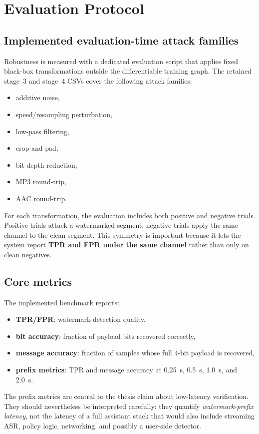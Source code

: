 \section{Evaluation Protocol}
\subsection{Implemented evaluation-time attack families}
Robustness is measured with a dedicated evaluation script that applies fixed black-box transformations outside the differentiable training graph. The retained stage~3 and stage~4 CSVs cover the following attack families:
\begin{itemize}[leftmargin=1.25em]
  \item additive noise,
  \item speed/resampling perturbation,
  \item low-pass filtering,
  \item crop-and-pad,
  \item bit-depth reduction,
  \item MP3 round-trip,
  \item AAC round-trip.
\end{itemize}
For each transformation, the evaluation includes both positive and negative trials. Positive trials attack a watermarked segment; negative trials apply the same channel to the clean segment. This symmetry is important because it lets the system report \textbf{TPR and FPR under the same channel} rather than only on clean negatives.

\subsection{Core metrics}
The implemented benchmark reports:
\begin{itemize}[leftmargin=1.25em]
  \item \textbf{TPR/FPR}: watermark-detection quality,
  \item \textbf{bit accuracy}: fraction of payload bits recovered correctly,
  \item \textbf{message accuracy}: fraction of samples whose full 4-bit payload is recovered,
  \item \textbf{prefix metrics}: TPR and message accuracy at 0.25~s, 0.5~s, 1.0~s, and 2.0~s.
\end{itemize}
The prefix metrics are central to the thesis claim about low-latency verification. They should nevertheless be interpreted carefully: they quantify \emph{watermark-prefix latency}, not the latency of a full assistant stack that would also include streaming ASR, policy logic, networking, and possibly a user-side detector.

